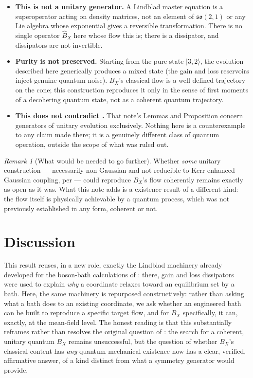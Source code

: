 \documentclass[12pt]{amsart}
\theoremstyle{plain}
\theoremstyle{remark}
\newtheorem*{remark}{Remark}
\begin{document}
\begin{itemize}
\item[(i)] \textbf{This is not a unitary generator.} A Lindblad master equation is a superoperator acting on density matrices, not an element of $\mathfrak{so}(2,1)$ or any Lie algebra whose exponential gives a reversible transformation. There is no single operator $\hat B_X$ here whose flow this is; there is a dissipator, and dissipators are not invertible.
\item[(ii)] \textbf{Purity is not preserved.} Starting from the pure state $|3,2\rangle$, the evolution described here generically produces a mixed state (the gain and loss reservoirs inject genuine quantum noise). $B_X$'s classical flow is a well-defined trajectory on the cone; this construction reproduces it only in the sense of first moments of a decohering quantum state, not as a coherent quantum trajectory.
\item[(iii)] \textbf{This does not contradict \cite{Ebert2026FourModes}.} That note's Lemmas and Proposition concern generators of unitary evolution exclusively. Nothing here is a counterexample to any claim made there; it is a genuinely different class of quantum operation, outside the scope of what was ruled out.
\end{itemize}

\begin{remark}[What would be needed to go further]
Whether \emph{some} unitary construction --- necessarily non-Gaussian and not reducible to Kerr-enhanced Gaussian coupling, per \cite{Ebert2026FourModes} --- could reproduce $B_X$'s flow coherently remains exactly as open as it was. What this note adds is a existence result of a different kind: the flow itself is physically achievable by a quantum process, which was not previously established in any form, coherent or not.
\end{remark}

\section{Discussion}

This result reuses, in a new role, exactly the Lindblad machinery already developed for the boson-bath calculations of \cite{Ebert2026Bath}: there, gain and loss dissipators were used to explain \emph{why} a coordinate relaxes toward an equilibrium set by a bath. Here, the same machinery is repurposed constructively: rather than asking what a bath does to an existing coordinate, we ask whether an engineered bath can be built to reproduce a specific target flow, and for $B_X$ specifically, it can, exactly, at the mean-field level. The honest reading is that this substantially reframes rather than resolves the original question of \cite{Ebert2026Quantum}: the search for a coherent, unitary quantum $B_X$ remains unsuccessful, but the question of whether $B_X$'s classical content has \emph{any} quantum-mechanical existence now has a clear, verified, affirmative answer, of a kind distinct from what a symmetry generator would provide.
\end{document}

